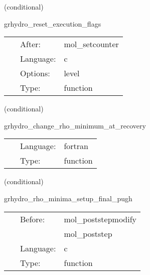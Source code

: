 \vspace{5mm}

   (conditional) 

\hspace{5mm} grhydro\_reset\_execution\_flags 

\hspace{5mm}{\it reset execution flags to 'yeah, execute'! } 


\hspace{5mm}

 \begin{tabular*}{160mm}{cll} 
~ & After:  & mol\_setcounter \\ 
~ & Language:  & c \\ 
~ & Options:  & level \\ 
~ & Type:  & function \\ 
\end{tabular*} 


\vspace{5mm}

   (conditional) 

\hspace{5mm} grhydro\_change\_rho\_minimum\_at\_recovery 

\hspace{5mm}{\it set up minimum for the rest-mass density in the atmosphere (before intial data) } 


\hspace{5mm}

 \begin{tabular*}{160mm}{cll} 
~ & Language:  & fortran \\ 
~ & Type:  & function \\ 
\end{tabular*} 


\vspace{5mm}

   (conditional) 

\hspace{5mm} grhydro\_rho\_minima\_setup\_final\_pugh 

\hspace{5mm}{\it set the value of the rest-mass density of the atmosphere which will be used during the evolution (pugh) } 


\hspace{5mm}

 \begin{tabular*}{160mm}{cll} 
~ & Before:  & mol\_poststepmodify \\ 
~& ~ &mol\_poststep\\ 
~ & Language:  & c \\ 
~ & Type:  & function \\ 
\end{tabular*} 


